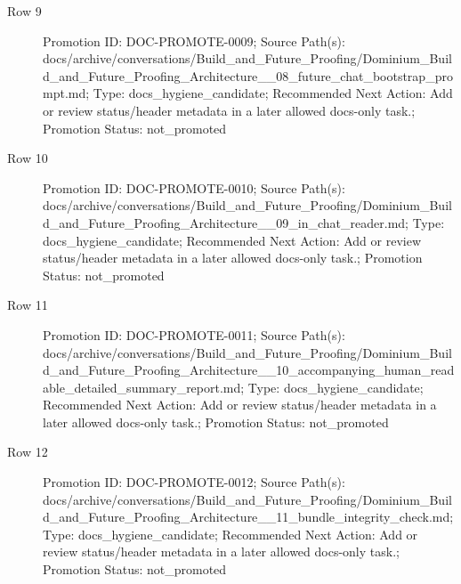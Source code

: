 \documentclass[9pt,a4paper,openany]{book}
\begin{document}
\begin{description}
\item[Row 9] Promotion ID: DOC-\allowbreak{}PROMOTE-\allowbreak{}0009; Source Path(s): docs/\allowbreak{}archive/\allowbreak{}conversations/\allowbreak{}Build\_\allowbreak{}and\_\allowbreak{}Future\_\allowbreak{}Proofing/\allowbreak{}Dominium\_\allowbreak{}Build\_\allowbreak{}and\_\allowbreak{}Future\_\allowbreak{}Proofing\_\allowbreak{}Architecture\_\allowbreak{}\_\allowbreak{}08\_\allowbreak{}future\_\allowbreak{}chat\_\allowbreak{}bootstrap\_\allowbreak{}prompt.\allowbreak{}md; Type: docs\_\allowbreak{}hygiene\_\allowbreak{}candidate; Recommended Next Action: Add or review status/\allowbreak{}header metadata in a later allowed docs-\allowbreak{}only task.\allowbreak{}; Promotion Status: not\_\allowbreak{}promoted
\item[Row 10] Promotion ID: DOC-\allowbreak{}PROMOTE-\allowbreak{}0010; Source Path(s): docs/\allowbreak{}archive/\allowbreak{}conversations/\allowbreak{}Build\_\allowbreak{}and\_\allowbreak{}Future\_\allowbreak{}Proofing/\allowbreak{}Dominium\_\allowbreak{}Build\_\allowbreak{}and\_\allowbreak{}Future\_\allowbreak{}Proofing\_\allowbreak{}Architecture\_\allowbreak{}\_\allowbreak{}09\_\allowbreak{}in\_\allowbreak{}chat\_\allowbreak{}reader.\allowbreak{}md; Type: docs\_\allowbreak{}hygiene\_\allowbreak{}candidate; Recommended Next Action: Add or review status/\allowbreak{}header metadata in a later allowed docs-\allowbreak{}only task.\allowbreak{}; Promotion Status: not\_\allowbreak{}promoted
\item[Row 11] Promotion ID: DOC-\allowbreak{}PROMOTE-\allowbreak{}0011; Source Path(s): docs/\allowbreak{}archive/\allowbreak{}conversations/\allowbreak{}Build\_\allowbreak{}and\_\allowbreak{}Future\_\allowbreak{}Proofing/\allowbreak{}Dominium\_\allowbreak{}Build\_\allowbreak{}and\_\allowbreak{}Future\_\allowbreak{}Proofing\_\allowbreak{}Architecture\_\allowbreak{}\_\allowbreak{}10\_\allowbreak{}accompanying\_\allowbreak{}human\_\allowbreak{}readable\_\allowbreak{}detailed\_\allowbreak{}summary\_\allowbreak{}report.\allowbreak{}md; Type: docs\_\allowbreak{}hygiene\_\allowbreak{}candidate; Recommended Next Action: Add or review status/\allowbreak{}header metadata in a later allowed docs-\allowbreak{}only task.\allowbreak{}; Promotion Status: not\_\allowbreak{}promoted
\item[Row 12] Promotion ID: DOC-\allowbreak{}PROMOTE-\allowbreak{}0012; Source Path(s): docs/\allowbreak{}archive/\allowbreak{}conversations/\allowbreak{}Build\_\allowbreak{}and\_\allowbreak{}Future\_\allowbreak{}Proofing/\allowbreak{}Dominium\_\allowbreak{}Build\_\allowbreak{}and\_\allowbreak{}Future\_\allowbreak{}Proofing\_\allowbreak{}Architecture\_\allowbreak{}\_\allowbreak{}11\_\allowbreak{}bundle\_\allowbreak{}integrity\_\allowbreak{}check.\allowbreak{}md; Type: docs\_\allowbreak{}hygiene\_\allowbreak{}candidate; Recommended Next Action: Add or review status/\allowbreak{}header metadata in a later allowed docs-\allowbreak{}only task.\allowbreak{}; Promotion Status: not\_\allowbreak{}promoted

\end{description}
\end{document}
